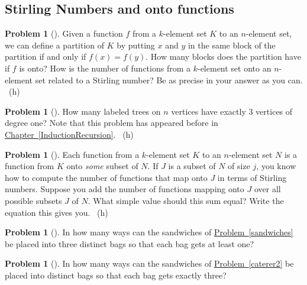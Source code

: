 \documentclass[10pt,]{book}
\theoremstyle{plain}
\theoremstyle{definition}
\newtheorem{activity}[project]{Problem}
\theoremstyle{definition}
\numberwithin{equation}{chapter}
\newcommand{\importantarrow}{\Rightarrow}
\begin{document}
\subsection[{Stirling Numbers and onto functions}]{Stirling Numbers and onto functions}\label{subsection-34}
\begin{activity}[] \label{activity-143}
\hypertarget{p-827}{}%
Given a function \(f\) from a \(k\)-element set \(K\) to an \(n\)-element set, we can define a partition of \(K\) by putting \(x\) and \(y\) in the same block of the partition if and only if \(f(x)=f(y)\). How many blocks does the partition have if \(f\) is onto? How is the number of functions from a \(k\)-element set onto an \(n\)-element set related to a Stirling number? Be as precise in your answer as you can.%
~{\tiny (h)}\end{activity}
\begin{activity}[]\marginsymbol[-1em]{\pdftooltip{$\importantarrow$}{especially interesting}} \label{activity-144}
\hypertarget{p-830}{}%
How many labeled trees on \(n\) vertices have exactly 3 vertices of degree one?  Note that this problem has appeared before in \hyperref[InductionRecursion]{Chapter~\ref{InductionRecursion}}.%
~{\tiny (h)}\end{activity}
\begin{activity}[] \label{Stirlingfalling}
\hypertarget{p-833}{}%
Each function from a \(k\)-element set \(K\) to an \(n\)-element set \(N\) is a function from \(K\) onto \emph{some} subset of \(N\). If \(J\) is a subset of \(N\) of size \(j\), you know how to compute the number of functions that map onto \(J\) in terms of Stirling numbers. Suppose you add the number of functions mapping onto \(J\) over all possible subsets \(J\) of \(N\). What simple value should this sum equal? Write the equation this gives you.%
~{\tiny (h)}\end{activity}
\begin{activity}[] \label{activity-146}
\hypertarget{p-836}{}%
In how many ways can the sandwiches of \hyperref[sandwiches]{Problem~\ref{sandwiches}} be placed into three distinct bags so that each bag gets at least one?%
\end{activity}
\begin{activity}[] \label{activity-147}
\hypertarget{p-838}{}%
In how many ways can the sandwiches of \hyperref[caterer2]{Problem~\ref{caterer2}} be placed into distinct bags so that each bag gets exactly three?%
\end{activity}
\end{document}
